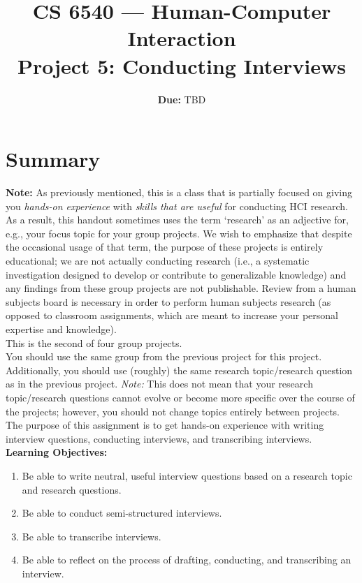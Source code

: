 \documentclass{article}
\title{CS 6540 --- Human-Computer Interaction\\\textbf{Project 5: Conducting Interviews}}
\author{ }
\date{\textbf{Due:} TBD}
\begin{document}
\maketitle

\section{Summary}
\textbf{Note:} As previously mentioned, this is a class that is partially focused on giving you \textit{hands-on experience} with \textit{skills that are useful} for conducting HCI research. As a result, this handout sometimes uses the term `research' as an adjective for, e.g., your focus topic for your group projects. We wish to emphasize that despite the occasional usage of that term, the purpose of these projects is entirely educational; we are not actually conducting research (i.e., a systematic investigation designed to develop or contribute to generalizable knowledge) and any findings from these group projects are not publishable. Review from a human subjects board is necessary in order to perform human subjects research (as opposed to classroom assignments, which are meant to increase your personal expertise and knowledge).\\

This is the second of four group projects.\\

You should use the same group from the previous project for this project. Additionally, you should use (roughly) the same research topic/research question as in the previous project. \textit{Note:} This does not mean that your research topic/research questions cannot evolve or become more specific over the course of the projects; however, you should not change topics entirely between projects.\\

The purpose of this assignment is to get hands-on experience with writing interview questions, conducting interviews, and transcribing interviews.\\

\textbf{Learning Objectives:}
\begin{enumerate}
    \item Be able to write neutral, useful interview questions based on a research topic and research questions.
    \item Be able to conduct semi-structured interviews.
    \item Be able to transcribe interviews.
    \item Be able to reflect on the process of drafting, conducting, and transcribing an interview.
\end{enumerate}\\
\end{document}
